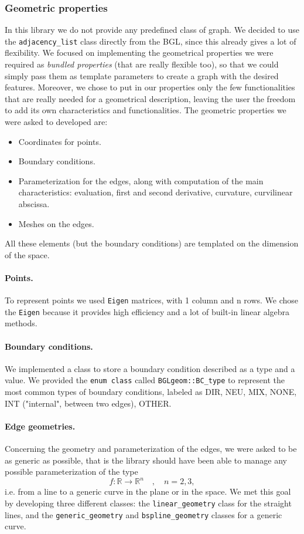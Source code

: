 \documentclass[10pt]{article} %
\newcommand{\classname}[1]{\texttt{#1}}
\begin{document}
	\subsubsection{Geometric properties}
	In this library we do not provide any predefined class of graph. We decided to use the \classname{adjacency\_list} class directly from the BGL, since this already gives a lot of flexibility. We focused on implementing the geometrical properties we were required as \textit{bundled properties} (that are really flexible too), so that we could simply pass them as template parameters to create a graph with the desired features. Moreover, we chose to put in our properties only the few functionalities that are really needed for a geometrical description, leaving the user the freedom to add its own characteristics and functionalities. \newline
	The geometric properties we were asked to developed are:
	\begin{itemize}
		\item Coordinates for points.
		\item Boundary conditions.
		\item Parameterization for the edges, along with computation of the main characteristics: evaluation, first and second derivative, curvature, curvilinear abscissa.
		\item Meshes on the edges.
	\end{itemize}
	All these elements (but the boundary conditions) are templated on the dimension of the space.				
	\paragraph{Points.}	To represent points we used \texttt{Eigen} matrices, with 1 column and n rows. We chose the \texttt{Eigen} because it provides high efficiency and a lot of built-in linear algebra methods.
	\paragraph{Boundary conditions.} We implemented a class to store a boundary condition described as a type and a value. We provided the \texttt{enum class} called \texttt{BGLgeom::BC\_type} to represent the most common types of boundary conditions, labeled as DIR, NEU, MIX, NONE, INT ("internal", between two edges), OTHER.
	\paragraph{Edge geometries.} Concerning the geometry and parameterization of the edges, we were asked to be as generic as possible, that is the library should have been able to manage any possible parameterization of the type
	\begin{equation*}
	f:\mathbb{R}\rightarrow\mathbb{R}^{n} \quad, \quad n=2,3 ,
	\end{equation*}
	i.e. from a line to a generic curve in the plane or in the space. We met this goal by developing three different classes: the \classname{linear\_geometry} class for the straight lines, and the \classname{generic\_geometry} and \classname{bspline\_geometry} classes for a generic curve.
\end{document}
